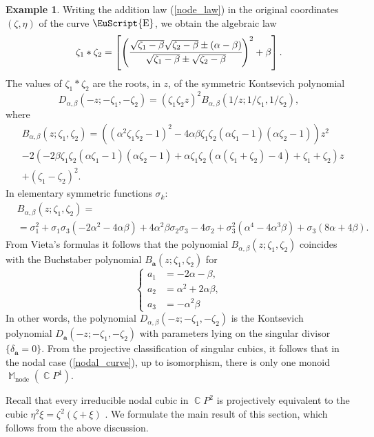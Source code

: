 \documentclass[14pt, dvipsnames]{extarticle}
\theoremstyle{plain}
\theoremstyle{definition}
\newtheorem{example}{\bf Example}
\theoremstyle{remark}
\DeclareMathOperator{\E}{\EuScript{E}}
\DeclareMathOperator{\Cc}{\mathbb{C}}
\DeclareMathOperator{\M}{\mathbb{M}}
\DeclareMathOperator{\node}{\mathrm{node}}
\begin{document}
\begin{example}
Writing the addition law (\ref{node_law}) in the original coordinates $(\zeta, \eta)$ of the curve $\E$, we obtain the algebraic law
$$\zeta_1\ast \zeta_2 = \left[ \left( \cfrac{\sqrt{\zeta_1-\beta}\sqrt{\zeta_2-\beta}\pm(\alpha-\beta)}{\sqrt{\zeta_1-\beta}\pm\sqrt{\zeta_2-\beta}} \right)^2+\beta\right].$$
The values of $\zeta_1\ast \zeta_2$ are the roots, in $z$, of the symmetric {Kontsevich polynomial}
$$D_{\alpha, \beta}(-z; -\zeta_1, -\zeta_2) = (\zeta_1\zeta_2z)^2B_{\alpha, \beta}(1/z; 1/{\zeta_1}, 1/{\zeta_2}),$$
where
$$\begin{aligned}
&B_{\alpha, \beta}(z; \zeta_1, \zeta_2) =\left(\left(\alpha ^2 \zeta_1 \zeta_2-1\right)^2-4 \alpha  \beta  \zeta_1 \zeta_2 (\alpha  \zeta_1-1) (\alpha  \zeta_2-1)\right)z^2 \\
&-2\left(-2 \beta  \zeta_1 \zeta_2 (\alpha  \zeta_1-1) (\alpha  \zeta_2-1)+\alpha  \zeta_1 \zeta_2 (\alpha  (\zeta_1+\zeta_2)-4)+\zeta_1+\zeta_2\right)z\\
&+(\zeta_1 - \zeta_2)^2.
\end{aligned}$$
In elementary symmetric functions $\sigma_k$:
$$\begin{aligned}
&B_{\alpha, \beta}(z; \zeta_1, \zeta_2) = \\
&=\sigma_1^2+\sigma_1 \sigma_3 \left(-2 \alpha ^2-4 \alpha  \beta \right)+4 \alpha ^2 \beta  \sigma_2 \sigma_3-4 \sigma_2+\sigma_3^2 \left(\alpha ^4-4 \alpha ^3 \beta \right)+\sigma_3 (8 \alpha +4 \beta ).
\end{aligned}$$
From Vieta's formulas it follows that the polynomial $B_{\alpha, \beta}(z; \zeta_1, \zeta_2)$ coincides with the Buchstaber polynomial $B_{\boldsymbol{a}}(z; \zeta_1, \zeta_2)$ for
$$\left\{\begin{aligned}
a_1 &= -2\alpha - \beta,\\
a_2 &= \alpha^2 + 2\alpha\beta,\\
a_3 &= -\alpha^2\beta
\end{aligned}\right.$$
In other words, the polynomial $D_{\alpha, \beta}(-z; -\zeta_1, -\zeta_2)$ is the Kontsevich polynomial $D_{\boldsymbol{a}}(-z; -\zeta_1, -\zeta_2)$ with parameters lying on the singular divisor $\{\delta_{\boldsymbol{a}} = 0\}$. From the projective classification of singular cubics, it follows that in the nodal case (\ref{nodal_curve}), up to isomorphism, there is only one monoid $\M_{\node}(\Cc\!P^1)$.   
\end{example}  




Recall that every irreducible nodal cubic in $\Cc\!P^2$ is projectively equivalent to the cubic $\eta^2\xi = \zeta^2(\zeta+\xi)$ \cite[Exercise 5-24]{Fulton}. We formulate the main result of this section, which follows from the above discussion.
\end{document}
